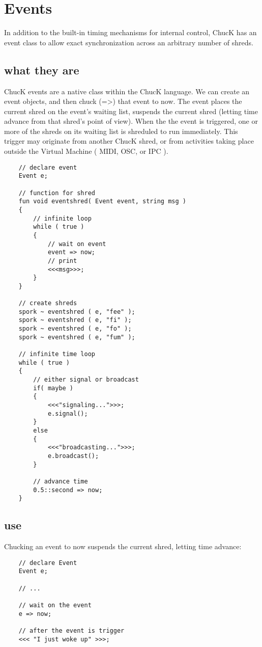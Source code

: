 \chapter{Events}


In addition to the built-in timing mechanisms for internal control, ChucK has an event class to allow exact synchronization across an arbitrary number of shreds.

\section{what they are}

ChucK events are a native class within the ChucK language. We can create an event objects, and then chuck (=>) that event to now. The event places the current shred on the event's waiting list, suspends the current shred (letting time advance from that shred's point of view). When the the event is triggered, one or more of the shreds on its waiting list is shreduled to run immediately. This trigger may originate from another ChucK shred, or from activities taking place outside the Virtual Machine ( MIDI, OSC, or IPC ).
\begin{verbatim}
    // declare event
    Event e;

    // function for shred
    fun void eventshred( Event event, string msg )
    {
        // infinite loop
        while ( true )
        {
            // wait on event
            event => now;
            // print
            <<<msg>>>;
        }
    }

    // create shreds
    spork ~ eventshred ( e, "fee" );
    spork ~ eventshred ( e, "fi" );
    spork ~ eventshred ( e, "fo" );
    spork ~ eventshred ( e, "fum" );

    // infinite time loop
    while ( true )
    {
        // either signal or broadcast
        if( maybe )
        { 
            <<<"signaling...">>>;
            e.signal();
        }
        else
        { 
            <<<"broadcasting...">>>;
            e.broadcast();
        }

        // advance time
        0.5::second => now;
    }
\end{verbatim}
 

\section{use}

Chucking an event to now suspends the current shred, letting time advance:
\begin{verbatim}
    // declare Event
    Event e;

    // ...

    // wait on the event
    e => now;

    // after the event is trigger
    <<< "I just woke up" >>>;
\end{verbatim}


